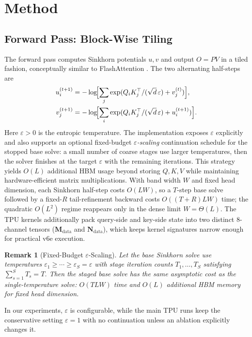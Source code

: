 \documentclass{article}
\newtheorem{remark}{Remark}
\begin{document}
\section{Method}

\subsection{Forward Pass: Block-Wise Tiling}
The forward pass computes Sinkhorn potentials $u, v$ and output $O = PV$ in a tiled fashion, conceptually similar to FlashAttention \citep{dao2022flashattention}. The two alternating half-steps are
\begin{align}
    u_i^{(t+1)} &= -\log\!\Bigl[\sum_{j} \exp(Q_i K_j^\top / (\sqrt{d}\,\varepsilon) + v_j^{(t)})\Bigr], \\
    v_j^{(t+1)} &= -\log\!\Bigl[\sum_{i} \exp(Q_i K_j^\top / (\sqrt{d}\,\varepsilon) + u_i^{(t+1)})\Bigr].
\end{align}
Here $\varepsilon > 0$ is the entropic temperature. The implementation exposes $\varepsilon$ explicitly and also supports an optional fixed-budget \emph{$\varepsilon$-scaling} continuation schedule for the stopped base solve: a small number of coarse stages use larger temperatures, then the solver finishes at the target $\varepsilon$ with the remaining iterations. This strategy yields $O(L)$ additional HBM usage beyond storing $Q,K,V$ while maintaining hardware-efficient matrix multiplications. With band width $W$ and fixed head dimension, each Sinkhorn half-step costs $O(LW)$, so a $T$-step base solve followed by a fixed-$R$ tail-refinement backward costs $O((T+R)LW)$ time; the quadratic $O(L^2)$ regime reappears only in the dense limit $W=\Theta(L)$. The TPU kernels additionally pack query-side and key-side state into two distinct 8-channel tensors ($\mathbf{M}_{\text{data}}$ and $\mathbf{N}_{\text{data}}$), which keeps kernel signatures narrow enough for practical v6e execution.

\begin{remark}[Fixed-Budget $\varepsilon$-Scaling]\label{rem:epsilon_scaling}
Let the base Sinkhorn solve use temperatures $\varepsilon_1 \ge \cdots \ge \varepsilon_S = \varepsilon$ with stage iteration counts $T_1,\dots,T_S$ satisfying $\sum_{s=1}^S T_s = T$. Then the staged base solve has the same asymptotic cost as the single-temperature solve: $O(TLW)$ time and $O(L)$ additional HBM memory for fixed head dimension.
\end{remark}

In our experiments, $\varepsilon$ is configurable, while the main TPU runs keep the conservative setting $\varepsilon = 1$ with no continuation unless an ablation explicitly changes it.
\end{document}
